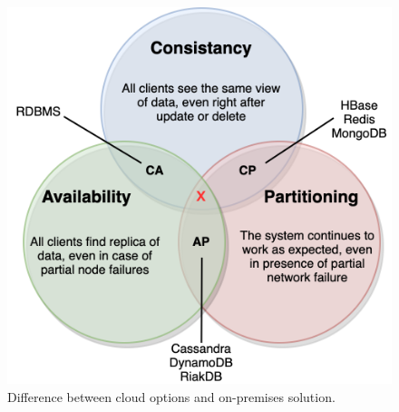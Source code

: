 \begin{figure}[H]
	\begin{center}
		\includegraphics[scale=0.9]{images/Figure17.png}
	\end{center}
	\vspace{-0.6cm}
	\caption{Difference between cloud options and on-premises solution.}
	\label{fig:fig17}
\end{figure}

